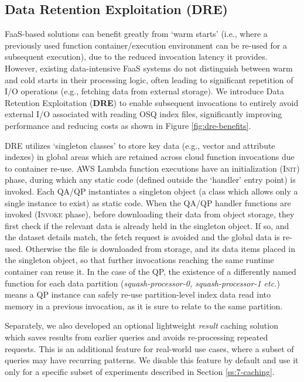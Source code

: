 \subsection{Data Retention Exploitation (DRE)}

FaaS-based solutions can benefit greatly from `warm starts' (i.e., where a previously used function container/execution environment can be re-used for a subsequent execution), due to the reduced invocation latency it provides. However, existing data-intensive FaaS systems do not distinguish between warm and cold starts in their processing logic, often leading to significant repetition of I/O operations (e.g., fetching data from external storage). We introduce Data Retention Exploitation (\textbf{DRE}) to enable subsequent invocations to entirely avoid external I/O associated with reading OSQ index files, significantly improving performance and reducing costs as shown in Figure \ref{fig:dre-benefits}.



 
DRE utilizes `singleton classes' to store key data (e.g., vector and attribute indexes) in global areas which are retained across cloud function invocations due to container re-use. AWS Lambda function executions have an initialization (\textsc{Init}) phase, during which any static code (defined outside the `handler' entry point) is invoked.
Each QA/QP instantiates a singleton object (a class which allows only a single instance to exist) as static code. When the QA/QP handler functions are invoked (\textsc{Invoke} phase), before downloading their data from object storage, they first check if the relevant data is already held in the singleton object. If so, and the dataset details match, the fetch request is avoided and the global data is re-used. Otherwise the file is downloaded from storage, and its data items placed in the singleton object, so that further invocations reaching the same runtime container can reuse it. In the case of the QP, the existence of a differently named function for each data partition (\textit{squash-processor-0, squash-processor-1 etc.}) means a QP instance can safely re-use partition-level index data read into memory in a previous invocation, as it is sure to relate to the same partition. 


Separately, we also developed an optional lightweight \textit{result} caching solution which saves results from earlier queries and avoids re-processing repeated requests. %
This is an additional feature for real-world use cases, where a subset of queries may have recurring patterns. We disable this feature by default and use it only for a specific subset of experiments described in Section \ref{ss:7-caching}.


